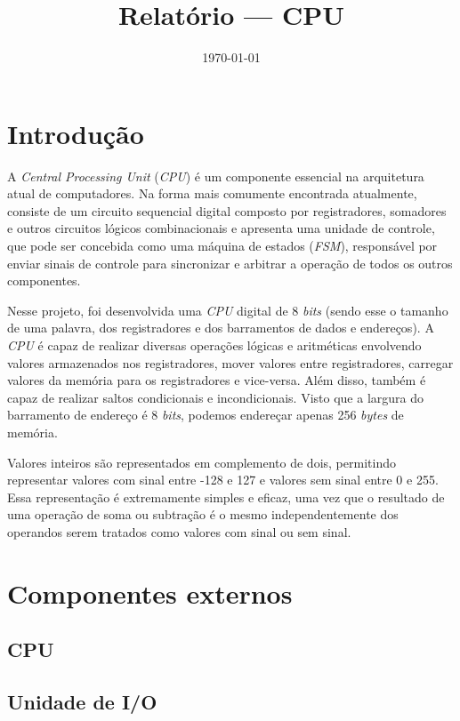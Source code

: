 \documentclass[a4paper,12pt]{report}
\title{Relatório --- CPU}
\date{\today}
\begin{document}
\maketitle

\section*{Introdução}

A \textit{Central Processing Unit} (\textit{CPU}) é um componente essencial
na arquitetura atual de computadores. Na forma mais comumente encontrada atualmente,
consiste de um circuito sequencial digital composto por registradores, somadores
e outros circuitos lógicos combinacionais e apresenta uma unidade de controle,
que pode ser concebida como uma máquina de estados (\textit{FSM}), responsável 
por enviar sinais de controle para sincronizar e arbitrar a operação de todos 
os outros componentes.

Nesse projeto, foi desenvolvida uma \textit{CPU} digital de 8 \textit{bits} (sendo
esse o tamanho de uma palavra, dos registradores e dos barramentos de dados e endereços).
A \textit{CPU} é capaz de realizar diversas operações lógicas e aritméticas 
envolvendo valores armazenados nos registradores, mover valores entre registradores,
carregar valores da memória para os registradores e vice-versa. Além disso, também é 
capaz de realizar saltos condicionais e incondicionais. Visto que a largura do 
barramento de endereço é 8 \textit{bits}, podemos endereçar apenas 256 \textit{bytes} 
de memória. 

Valores inteiros são representados em complemento de dois, permitindo
representar valores com sinal entre -128 e 127 e valores sem sinal entre 0 e 255.
Essa representação é extremamente simples e eficaz, uma vez que o resultado de
uma operação de soma ou subtração é o mesmo independentemente dos operandos serem 
tratados como valores com sinal ou sem sinal.

\section*{Componentes externos}

\subsection*{CPU}

\subsection*{Unidade de I/O}
\end{document}
